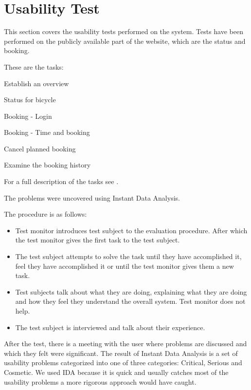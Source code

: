 \section{Usability Test}
This section covers the usability tests performed on the system.
Tests have been performed on the publicly available part of the website, which are the status and booking.

These are the tasks:

\begin{description}[style=nextline]
\item[Task 1] Establish an overview
\item[Task 2] Status for bicycle
\item[Task 3] Booking - Login
\item[Task 4] Booking - Time and booking
\item[Task 5] Cancel planned booking
\item[Task 6] Examine the booking history
\end{description}
For a full description of the tasks see .

The problems were uncovered using Instant Data Analysis.

The procedure is as follows:
\begin{itemize}
\item Test monitor introduces test subject to the evaluation procedure. After which the test monitor gives the first task to the test subject.
\item The test subject attempts to solve the task until they have accomplished it, feel they have accomplished it or until the test monitor gives them a new task.
\item Test subjects talk about what they are doing, explaining what they are doing and how they feel they understand the overall system. Test monitor does not help.
\item The test subject is interviewed and talk about their experience.
\end{itemize}\citep{misc:usabilitytest}

After the test, there is a meeting with the user where problems are discussed and which they felt were significant.
The result of Instant Data Analysis is a set of usability problems categorized into one of three categories: Critical, Serious and Cosmetic.
We used IDA because it is quick and usually catches most of the usability problems a more rigorous approach would have caught.

